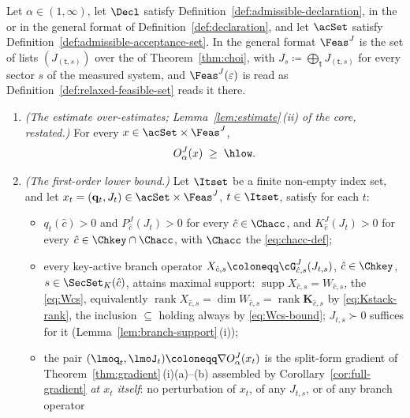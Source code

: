 \begin{theorem}
\label{thm:firstorder}
Let $\alpha\in(1,\infty)$, let $\Decl$ satisfy
Definition~\ref{def:admissible-declaration}, in the  or in the general
format of Definition~\ref{def:declaration}, and let $\acSet$ satisfy
Definition~\ref{def:admissible-acceptance-set}. In the general format $\Feas^{J}$ is the set of
lists $(J_{(\mathsf t,s)})$ over the  of
Theorem~\ref{thm:choi}, with $J_s\coloneqq\bigoplus_{\mathsf t}
J_{(\mathsf t,s)}$ for every sector $s$ of the measured system, and
$\Feas^{J}(\varepsilon)$ is read as
Definition~\ref{def:relaxed-feasible-set} reads it there.
\begin{enumerate}[label=(\roman*),leftmargin=2.2em]
\item \emph{(The estimate over-estimates; Lemma~\ref{lem:estimate}\,(ii)
of the core, restated.)} For every $x\in\acSet\times\Feas^{J}$,
\begin{equation}\label{eq:fo-estimate}
  O^{J}_{\alpha}(x)\;\ge\;\hlow .
\end{equation}
\item \emph{(The first-order lower bound.)} Let $\Itset$ be a finite
non-empty index set, and let
$x_t=(\mathbf q_t,J_t)\in\acSet\times\Feas^{J}$, $t\in\Itset$, satisfy
for each $t$:
\begin{itemize}[leftmargin=2.6em]
\item[(H-POS)] $q_t(\hat c)>0$ and $P^{J}_{\hat c}(J_t)>0$ for every
  $\hat c\in\Chacc$, and $K^{J}_{\hat c}(J_t)>0$ for every
  $\hat c\in\Chkey\cap\Chacc$, with $\Chacc$ the 
  \eqref{eq:chacc-def};
\item[(H-SUPP)] every key-active branch operator
  $X_{\hat c,s}\coloneqq\cG^{J}_{\hat c,s}(J_{t,s})$,
  $\hat c\in\Chkey$, $s\in\SecSet_K(\hat c)$, attains maximal support:
  $\operatorname{supp}X_{\hat c,s}=W_{\hat c,s}$, the
   \eqref{eq:Wcs}, equivalently
  $\operatorname{rank}X_{\hat c,s}=\dim W_{\hat c,s}
  =\operatorname{rank}\mathbf K_{\hat c,s}$ by \eqref{eq:Kstack-rank},
  the inclusion $\subseteq$ holding always by \eqref{eq:Wcs-bound};
  $J_{t,s}\succ0$ suffices for it (Lemma~\ref{lem:branch-support}\,(i));
\item[(H-NOPERT)] the pair
  $(\lmoq_t,\lmoJ_t)\coloneqq\nabla O^{J}_{\alpha}(x_t)$ is the
  split-form gradient of Theorem~\ref{thm:gradient}\,(i)(a)--(b) assembled
  by Corollary~\ref{cor:full-gradient} \emph{at $x_t$ itself}: no
  perturbation of $x_t$, of any $J_{t,s}$, or of any branch operator

\end{itemize}
\end{enumerate}
\end{theorem}
